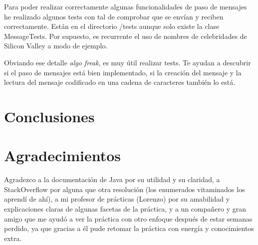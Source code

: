 \documentclass{article}
\begin{document}
Para poder realizar correctamente algunas funcionalidades de paso de mensajes he realizado algunos tests con tal de comprobar que se envían y reciben correctamente. Están en el directorio /tests aunque solo existe la clase MessageTests. Por supuesto, es recurrente el uso de nombres de celebridades de Silicon Valley a modo de ejemplo.

Obviando ese detalle \textit{algo freak}, es muy útil realizar tests. Te ayudan a descubrir si el paso de mensajes está bien implementado, si la creación del mensaje y la lectura del mensaje codificado en una cadena de caracteres también lo está.

\section{Conclusiones}

\section{Agradecimientos}

Agradezco a la documentación de Java por su utilidad y su claridad, a StackOverflow por alguna que otra resolución (los enumerados vitaminados los aprendí de ahí), a mi profesor de prácticas (Lorenzo) por su amabilidad y explicaciones claras de algunas facetas de la práctica, y a un compañero y gran amigo que me ayudó a ver la práctica con otro enfoque después de estar semanas perdido, ya que gracias a él pude retomar la práctica con energía y conocimientos extra.
\end{document}
